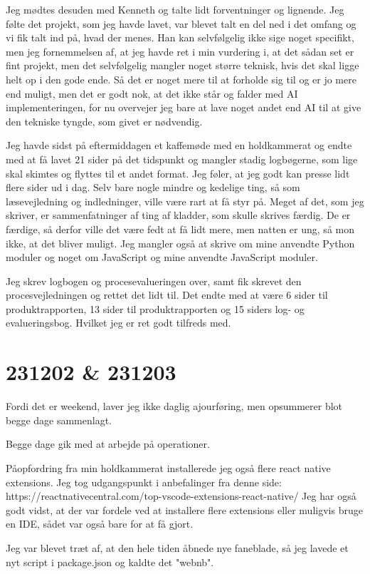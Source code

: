 \documentclass{report}
\begin{document}
Jeg mødtes desuden med Kenneth og talte lidt forventninger og lignende. Jeg følte det projekt, som jeg havde lavet, var blevet talt en del ned i det omfang og vi fik talt ind på, hvad der menes. Han kan selvfølgelig ikke sige noget specifikt, men jeg fornemmelsen af, at jeg havde ret i min vurdering i, at det sådan set er fint projekt, men det selvfølgelig mangler noget større teknisk, hvis det skal ligge helt op i den gode ende.
Så det er noget mere til at forholde sig til og er jo mere end muligt, men det er godt nok, at det ikke står og falder med AI implementeringen, for nu overvejer jeg bare at lave noget andet end AI til at give den tekniske tyngde, som givet er nødvendig.
 
Jeg havde sidst på eftermiddagen et kaffemøde med en holdkammerat og endte med at få lavet 21 sider på det tidspunkt og mangler stadig logbøgerne, som lige skal skimtes og flyttes til et andet format.
Jeg føler, at jeg godt kan presse lidt flere sider ud i dag. Selv bare nogle mindre og kedelige ting, så som læsevejledning og indledninger, ville være rart at få styr på.
Meget af det, som jeg skriver, er sammenfatninger af ting af kladder, som skulle skrives færdig. De er færdige, så derfor ville det være fedt at få lidt mere, men natten er ung, så mon ikke, at det bliver muligt.
Jeg mangler også at skrive om mine anvendte Python moduler og noget om JavaScript og mine anvendte JavaScript moduler.

Jeg skrev logbogen og procesevalueringen over, samt fik skrevet den procesvejledningen og rettet det lidt til.
Det endte med at være 6 sider til produktrapporten, 13 sider til produktrapporten og 15 siders log- og evalueringsbog.
Hvilket jeg er ret godt tilfreds med.

\section{231202 \& 231203}
Fordi det er weekend, laver jeg ikke daglig ajourføring, men opsummerer blot begge dage sammenlagt.
 
Begge dage gik med at arbejde på operationer.
 
Påopfordring fra min holdkammerat installerede jeg også flere react native extensions.
Jeg tog udgangspunkt i anbefalinger fra denne side: https://reactnativecentral.com/top-vscode-extensions-react-native/
Jeg har også godt vidst, at der var fordele ved at installere flere extensions eller muligvis bruge en IDE, sådet var også bare for at få gjort.
 
Jeg var blevet træt af, at den hele tiden åbnede nye faneblade, så jeg lavede et nyt script i package.json og kaldte det "webnb".
 
\end{document}
